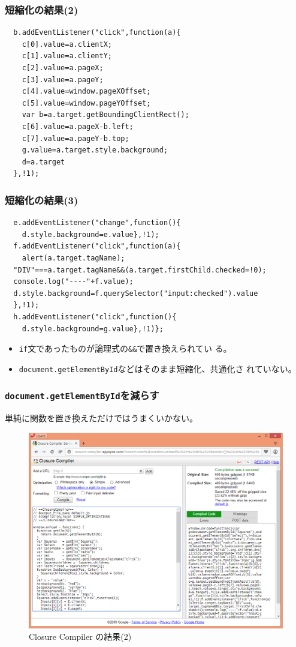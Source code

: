 \documentclass[dvipsk]{beamer}
\begin{document}
\begin{frame}[containsverbatim]
 \frametitle{短縮化の結果(2)}
 {\footnotesize
\begin{verbatim}
  b.addEventListener("click",function(a){
    c[0].value=a.clientX;
    c[1].value=a.clientY;
    c[2].value=a.pageX;
    c[3].value=a.pageY;
    c[4].value=window.pageXOffset;
    c[5].value=window.pageYOffset;
    var b=a.target.getBoundingClientRect();
    c[6].value=a.pageX-b.left;
    c[7].value=a.pageY-b.top;
    g.value=a.target.style.background;
    d=a.target
  },!1);
\end{verbatim}
 }
\end{frame}
\begin{frame}[containsverbatim]
 \frametitle{短縮化の結果(3)}
 {\footnotesize
\begin{verbatim}
  e.addEventListener("change",function(){
    d.style.background=e.value},!1);
  f.addEventListener("click",function(a){
    alert(a.target.tagName);
  "DIV"===a.target.tagName&&(a.target.firstChild.checked=!0);
  console.log("----"+f.value);
  d.style.background=f.querySelector("input:checked").value
  },!1);
  h.addEventListener("click",function(){
    d.style.background=g.value},!1)};
\end{verbatim}
 }
 \begin{itemize}
	\item  \texttt{if}文であったものが論理式の\verb+&&+で置き換えられてい
				 る。
	\item \texttt{document.getElementById}などはそのまま短縮化、共通化さ
れていない。
 \end{itemize}

\end{frame}
\begin{frame}[containsverbatim]
 \frametitle{\texttt{document.getElementById}を減らす}
 単純に関数を置き換えただけではうまくいかない。
  \begin{figure}[ht]
	\begin{center}
	 \includegraphics[width=1\textwidth]{../10-01closur-compiler-res02.eps}
	\end{center}
 \caption{Closure Compiler の結果(2)}\label{closure-compiler-res02}
 \end{figure}
\end{frame}
\end{document}
